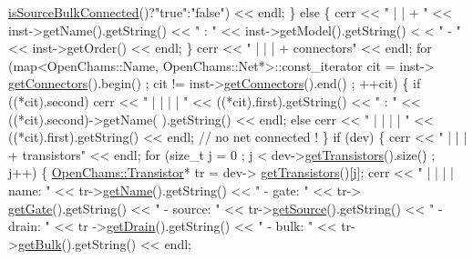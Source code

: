 \begin{DoxyCodeInclude}
      \mbox{\hyperlink{class_open_chams_1_1_device_a29ed1982e1a8b3a634df8d0c70039669}{isSourceBulkConnected}}()?\textcolor{stringliteral}{"true"}:\textcolor{stringliteral}{"false"}) << endl;
            \} \textcolor{keywordflow}{else} \{
                cerr << \textcolor{stringliteral}{" | | + "} << inst->getName().getString() << \textcolor{stringliteral}{" : "} << inst->getModel().getString() <
      < \textcolor{stringliteral}{" - "} << inst->getOrder() << endl;
            \}
            cerr << \textcolor{stringliteral}{" | | | + connectors"} << endl;
            \textcolor{keywordflow}{for} (map<OpenChams::Name, OpenChams::Net*>::const\_iterator cit = inst->
      \mbox{\hyperlink{class_open_chams_1_1_instance_a745fe0a50eb770ce3bea36ef0e62c8ca}{getConnectors}}().begin() ; cit != inst->\mbox{\hyperlink{class_open_chams_1_1_instance_a745fe0a50eb770ce3bea36ef0e62c8ca}{getConnectors}}().end() ; ++cit) \{
                \textcolor{keywordflow}{if} ((*cit).second)
                    cerr << \textcolor{stringliteral}{" | | | | "} << ((*cit).first).getString() << \textcolor{stringliteral}{" : "} << ((*cit).second)->getName(
      ).getString() << endl;
                \textcolor{keywordflow}{else}
                    cerr << \textcolor{stringliteral}{" | | | | "} << ((*cit).first).getString() << endl; \textcolor{comment}{// no net connected !}
            \}
            \textcolor{keywordflow}{if} (dev) \{
                cerr << \textcolor{stringliteral}{" | | | + transistors"} << endl;
                \textcolor{keywordflow}{for} (\textcolor{keywordtype}{size\_t} j = 0 ; j < dev->\mbox{\hyperlink{class_open_chams_1_1_device_a4033525cab6387eb057f71f5feed9802}{getTransistors}}().size() ; j++) \{
                    \mbox{\hyperlink{class_open_chams_1_1_transistor}{OpenChams::Transistor}}* tr = dev->
      \mbox{\hyperlink{class_open_chams_1_1_device_a4033525cab6387eb057f71f5feed9802}{getTransistors}}()[j];
                    cerr << \textcolor{stringliteral}{" | | | | name: "} <<  tr->\mbox{\hyperlink{class_open_chams_1_1_transistor_a2858c0c4e8b5108f041237cf5a802029}{getName}}().getString() << \textcolor{stringliteral}{" - gate: "} << tr->
      \mbox{\hyperlink{class_open_chams_1_1_transistor_a99f1449aa735ff6cb4927b4f6aa34d9d}{getGate}}().getString() << \textcolor{stringliteral}{" - source: "} << tr->\mbox{\hyperlink{class_open_chams_1_1_transistor_aee4d52a0b13e6db247c1a6c051aede25}{getSource}}().getString() << \textcolor{stringliteral}{" - drain: "} << tr
      ->\mbox{\hyperlink{class_open_chams_1_1_transistor_a62ea0998b3a61310a8331873f5bcce58}{getDrain}}().getString() << \textcolor{stringliteral}{" - bulk: "} << tr->\mbox{\hyperlink{class_open_chams_1_1_transistor_a27ba43f825f9243556ec65d306a2b1a7}{getBulk}}().getString() << endl;

\end{DoxyCodeInclude}
